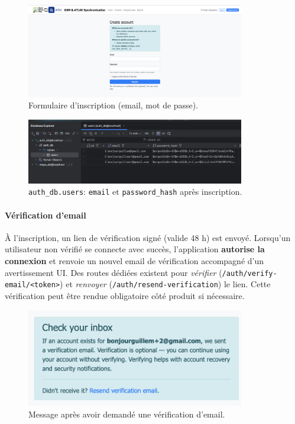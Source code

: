 \begin{figure}[H]
  \centering
  \includegraphics[width=0.85\textwidth]{../figures/chap10/create_account.png}
  \caption{Formulaire d'inscription (email, mot de passe).}
\end{figure}

\begin{figure}[H]
  \centering
  \includegraphics[width=0.85\textwidth]{../figures/chap10/auth_db1.png}
  \caption{\texttt{auth\_db.users}: \texttt{email} et \texttt{password\_hash} après inscription.}
\end{figure}

\paragraph{Vérification d'email}
À l'inscription, un lien de vérification signé (valide 48 h) est envoyé. Lorsqu'un utilisateur non vérifié se connecte avec succès, l'application \textbf{autorise la connexion} et renvoie un nouvel email de vérification accompagné d'un avertissement UI. Des routes dédiées existent pour \textit{vérifier} (\texttt{/auth/verify-email/<token>}) et \textit{renvoyer} (\texttt{/auth/resend-verification}) le lien. Cette vérification peut être rendue obligatoire côté produit si nécessaire.

\begin{figure}[H]
  \centering
  \includegraphics[width=0.85\textwidth]{../figures/chap10/message after clicking email verification.png}
  \caption{Message après avoir demandé une vérification d'email.}
\end{figure}

